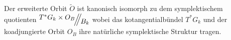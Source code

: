 \begin{comment}
\begin{beh}
$\dim(\tilde O)=\dim(O)+2n$
\end{beh}
\end{comment}
\begin{comment}
\ccite[p27]{thboalch}
\[
\Theta :=\left\{ A\in\mathfrak g_k^*\mid (g_0,A)\in\tilde O
  \text{ für ein passendes } g_0\in\GL_n(\C) \right\}
\]
ist der Kern der Projektion
\[
\tilde O\to\mathfrak g_k^*;\qquad (g_0,A)\mapsto A
\]
\begin{cor}
\ccite[Corollary 2.15]{thboalch}
The extended orbit $\tilde O$ is a principal $T$ bundle over $\theta$.
\end{cor}
\end{comment}
\begin{comment}
Wie sieht denn die $B_k$ Wirkung auf $T^*G_k\times O_B$ aus?\\
Siehe: \cite[Definition 1.47]{thboalch}
\begin{defn} \ccite[Definition 1.47]{thboalch}
Die \emph{links Wirkung} von $G$ auf $T^*G$ ist \comm{(in terms of left
trivialisation)}:
\[
\beta(g,A)=(\beta g,A)\,.
\]
Die \emph{rechts Wirkung} \dots
\end{defn}
\begin{lem} \ccite[Lemma 1.48]{thboalch}
Die links Wirkung von $G$ auf $T^*G$ ist Hamiltonisch mit einer
equivarianten momenten Abbildung gegeben \comm{(in terms of left
trivialisation)} durch
\[
\mu_L:G\times\mathfrak g^* \to \mathfrak g^*; \qquad (g,A)\mapsto -\Ad_g^*(A)
\]
Die rechts Wirkung \dots
\end{lem}
Und $B_k$ wirkt auf $O_B$ durch Konjungation.\\
Damit ergibt sich zusammen die $B_k$ Wirkung auf $T^*G_k\times O_B$ durch
\[
\beta(g,A,B)=(\beta g,A,\beta B\beta^{-1})
\]
\end{comment}
\begin{lem}
Der erweiterte Orbit $\tilde O$ ist kanonisch isomorph zu dem symplektischem
quotienten $\symplquot{T^*G_k\times O_B}{B_k}$ wobei das kotangentialbündel
$T^*G_k$ und der koadjungierte Orbit $O_B$ ihre natürliche symplektische
Struktur tragen.
\begin{comment}
Entspricht
\cite[Proposition 2.19]{thboalch}
zusammen mit
\cite[Remark 2.20]{thboalch}
\end{comment}
\end{lem}
